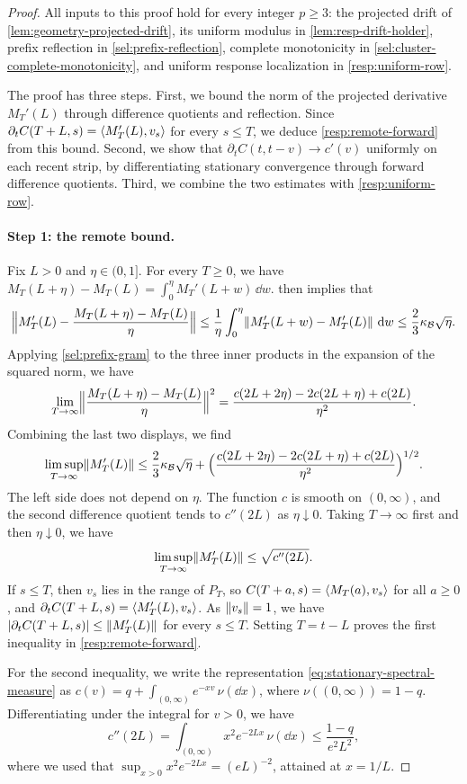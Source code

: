 \begin{proof}
All inputs to this proof hold for every integer $p\ge3$: the projected drift of \cref{lem:geometry-projected-drift}, its uniform modulus in \cref{lem:resp-drift-holder}, prefix reflection in \cref{sel:prefix-reflection}, complete monotonicity in \cref{sel:cluster-complete-monotonicity}, and uniform response localization in \cref{resp:uniform-row}.

The proof has three steps. First, we bound the norm of the projected derivative $M_T'(L)$ through difference quotients and reflection. Since $\partial_tC(T+L,s)=\left\langle M_T'(L),v_s\right\rangle$ for every $s\le T$, we deduce \eqref{resp:remote-forward} from this bound. Second, we show that $\partial_tC(t,t-v)\to c'(v)$ uniformly on each recent strip, by differentiating stationary convergence through forward difference quotients. Third, we combine the two estimates with \cref{resp:uniform-row}.

\paragraph{Step 1: the remote bound.}
Fix $L>0$ and $\eta\in(0,1]$. For every $T\ge0$, we have $M_T(L+\eta)-M_T(L)=\int_0^\eta M_T'(L+w)\,\dd w$.  then implies that
\[
 \Bigl\|M_T'(L)-\frac{M_T(L+\eta)-M_T(L)}\eta\Bigr\|
 \le\frac1\eta\int_0^\eta\lVert M_T'(L+w)-M_T'(L)\rVert\,\mathop{}\!\mathrm d w
 \le\frac23\kappa_{\mathcal B}\sqrt\eta.
\]
Applying \eqref{sel:prefix-gram} to the three inner products in the expansion of the squared norm, we have
\[
 \lim_{T\to\infty}\Bigl\|\frac{M_T(L+\eta)-M_T(L)}\eta\Bigr\|^2
 =\frac{c(2L+2\eta)-2c(2L+\eta)+c(2L)}{\eta^2}.
\]
Combining the last two displays, we find
\[
 \limsup_{T\to\infty}\lVert M_T'(L)\rVert
 \le\frac23\kappa_{\mathcal B}\sqrt\eta
 +\Bigl(\frac{c(2L+2\eta)-2c(2L+\eta)+c(2L)}{\eta^2}\Bigr)^{1/2}.
\]
The left side does not depend on $\eta$. The function $c$ is smooth on $(0,\infty)$, and the second difference quotient tends to $c''(2L)$ as $\eta\downarrow0$. Taking $T\to\infty$ first and then $\eta\downarrow0$, we have
\[
 \limsup_{T\to\infty}\lVert M_T'(L)\rVert\le\sqrt{c''(2L)}.
\]
If $s\le T$, then $v_s$ lies in the range of $P_T$, so $C(T+a,s)=\left\langle M_T(a),v_s\right\rangle$ for all $a\ge0$, and $\partial_tC(T+L,s)=\left\langle M_T'(L),v_s\right\rangle$. As $\lVert v_s\rVert=1$, we have $|\partial_tC(T+L,s)|\le\lVert M_T'(L)\rVert$ for every $s\le T$. Setting $T=t-L$ proves the first inequality in \eqref{resp:remote-forward}.

For the second inequality, we write the representation \eqref{eq:stationary-spectral-measure} as $c(v)=q+\int_{(0,\infty)}e^{-xv}\,\nu(\dd x)$, where $\nu((0,\infty))=1-q$. Differentiating under the integral for $v>0$, we have
\[
 c''(2L)=\int_{(0,\infty)}x^2e^{-2Lx}\,\nu(\dd x)\le\frac{1-q}{e^2L^2},
\]
where we used that $\sup_{x>0}x^2e^{-2Lx}=(eL)^{-2}$, attained at $x=1/L$.


\end{proof}
